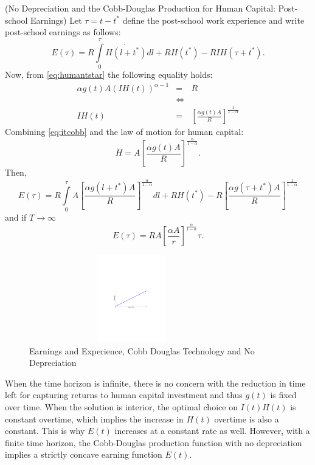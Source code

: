 \begin{case} (No Depreciation and the Cobb-Douglas Production for Human Capital: Post-school Earnings)
Let $\tau = t - t^*$ define the post-school work experience and write post-school earnings as follows:
\begin{equation}
E(\tau) = R \int \limits _{0} ^{\tau} \dot{H( l + t^*)}d l + R H(t^*) - RIH(\tau + t^*).
\end{equation}
Now, from \eqref{eq:humantstar} the following equality holds:
\begin{eqnarray}
\alpha g(t) A \left( IH(t) \right)^{\alpha - 1} &=& R \nonumber \\
&\Leftrightarrow& \nonumber \\
IH(t) &=& \left[ \frac{\alpha g(t) A}{R} \right]^{\frac{1}{1-\alpha}} \label{eq:itcobb}
\end{eqnarray}
Combining \eqref{eq:itcobb} and the law of motion for human capital:
\begin{equation}
\dot{H} = A \left[ \frac{\alpha g(t) A}{R} \right]^{\frac{\alpha}{1-\alpha}} \label{eq:hdot}.
\end{equation}
Then,
\begin{equation}
E(\tau) = R \int \limits _{0} ^{\tau} A \left[ \frac{\alpha g(l + t^*) A}{R} \right]^{\frac{\alpha}{1-\alpha}} dl + RH(t^*) - R \left[ \frac{\alpha g \left( \tau + t^* \right) A}{R} \right]^{\frac{1}{1-\alpha}} \label{equation:postearnings}
\end{equation}
and if $T \rightarrow \infty$
\begin{equation}
E(\tau) = RA \left[ \frac{\alpha A}{r} \right]^{\frac{\alpha}{1-\alpha}} \tau.
\end{equation}

\begin{center}
\begin{figure}[H]
\caption{Earnings and Experience, Cobb Douglas Technology and No Depreciation}
\centering
\includegraphics[width=3.5in, height=1.5in]{Figures/fig-earnings-experience.pdf}
\end{figure}
\end{center}

\indent When the time horizon is infinite, there is no concern with the reduction in time left for capturing returns to human capital investment and thus $g(t)$ is fixed over time. When the solution is interior, the optimal choice on $I(t)H(t)$ is constant overtime, which implies the increase in $H(t)$ overtime is also a constant. This is why $E(t)$ increases at a constant rate as well. However, with a finite time horizon, the Cobb-Douglas production function with no depreciation implies a strictly concave earning function $E(t)$.
\end{case}

